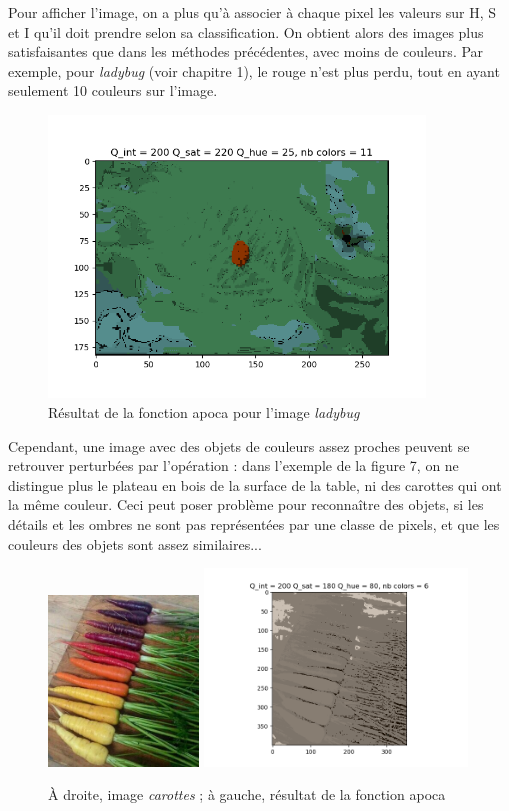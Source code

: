 \documentclass{article}
\begin{document}
Pour afficher l'image, on a plus qu'à associer à chaque pixel les valeurs sur H, S et I qu'il doit prendre selon sa classification. On obtient alors des images plus satisfaisantes que dans les méthodes précédentes, avec moins de couleurs. Par exemple, pour {\it ladybug} (voir chapitre 1), le rouge n'est plus perdu, tout en ayant seulement 10 couleurs sur l'image.\\

\begin{figure}[h]
    \centering
    \includegraphics[width=10cm]{fig6.png}
    \caption{Résultat de la fonction apoca pour l'image {\it ladybug}}
\end{figure}

Cependant, une image avec des objets de couleurs assez proches peuvent se retrouver perturbées par l'opération : dans l'exemple de la figure 7, on ne distingue plus le plateau en bois de la surface de la table, ni des carottes qui ont la même couleur. Ceci peut poser problème pour reconnaître des objets, si les détails et les ombres ne sont pas représentées par une classe de pixels, et que les couleurs des objets sont assez similaires...\\

\begin{figure}[h]
    \centering
    \includegraphics[width=4cm]{carottes.jpg}
    \includegraphics[width=7cm]{fig7.png}
    \caption{À droite, image {\it carottes} ; à gauche, résultat de la fonction apoca}
\end{figure}
\end{document}
